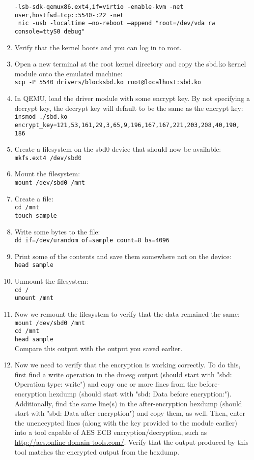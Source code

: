 \documentclass[letterpaper,10pt,titlepage,draftclsnofoot,onecolumn]{article}
\begin{document}
\begin{enumerate}
\texttt{-lsb-sdk-qemux86.ext4,if=virtio -enable-kvm -net user,hostfwd=tcp::5540-:22 -net}\\
\texttt{ nic -usb -localtime --no-reboot --append "root=/dev/vda rw console=ttyS0 debug"}
\item Verify that the kernel boots and you can log in to root.
\item Open a new terminal at the root kernel directory and copy the sbd.ko kernel module onto the emulated machine:\\
\texttt{scp -P 5540 drivers/blocksbd.ko root@localhost:sbd.ko}
\item In QEMU, load the driver module with some encrypt key. By not specifying a decrypt key, the decrypt key will default to be the same as the encrypt key:\\
\texttt{insmod ./sbd.ko encrypt\_key=121,53,161,29,3,65,9,196,167,167,221,203,208,40,190,}\\
\texttt{186}
\item Create a filesystem on the sbd0 device that should now be available:\\
\texttt{mkfs.ext4 /dev/sbd0}
\item Mount the filesystem:\\
\texttt{mount /dev/sbd0 /mnt}
\item Create a file:\\
\texttt{cd /mnt}\\
\texttt{touch sample}
\item Write some bytes to the file:\\
\texttt{dd if=/dev/urandom of=sample count=8 bs=4096}
\item Print some of the contents and save them somewhere not on the device:\\
\texttt{head sample}
\item Unmount the filesystem:\\
\texttt{cd /}\\
\texttt{umount /mnt}
\item Now we remount the filesystem to verify that the data remained the same:\\
\texttt{mount /dev/sbd0 /mnt}\\
\texttt{cd /mnt}\\
\texttt{head sample}\\
Compare this output with the output you saved earlier.
\item Now we need to verify that the encryption is working correctly. To do this, first find a write operation in the dmesg output (should start with "sbd: Operation type: write") and copy one or more lines from the before-encryption hexdump (should start with "sbd: Data before encryption:"). Additionally, find the same line(s) in the after-encryption hexdump (should start with "sbd: Data after encryption") and copy them, as well. Then, enter the unenceypted lines (along with the key provided to the module earlier) into a tool capable of AES ECB encryption/decryption, such as \url{http://aes.online-domain-tools.com/}. Verify that the output produced by this tool matches the encrypted output from the hexdump.

\end{enumerate}
\end{document}
